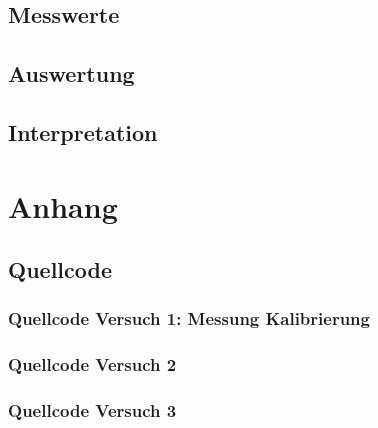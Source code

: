 \documentclass[12pt, oneside, a4paper, \docLanguage]{report}
\begin{document}
\section{Messwerte}
\label{chap:VERSUCH_3_MESSWERTE}

\section{Auswertung}
\label{chap:VERSUCH_3_AUSWERTUNG}

\section{Interpretation}
\label{chap:VERSUCH_3_INTERPRETATION}

%
%
\renewcommand\thesection{A.\arabic{section}}
\renewcommand\thesubsection{\thesection.\arabic{subsection}}

\chapter*{Anhang}
\label{chap:APPENDIX}
\addtocounter{chapter}{1}
\setcounter{section}{0}

\section{Quellcode}
\label{chap:APPENDIX_SOURCECODE}

\subsection{Quellcode Versuch 1: Messung Kalibrierung}
\label{chap:APPENDIX_SOURCECODE_V1}

\newpage
\subsection{Quellcode Versuch 2}
\label{chap:APPENDIX_SOURCECODE_V2}

\newpage
\subsection{Quellcode Versuch 3}
\label{chap:APPENDIX_SOURCECODE_V3}

\end{document}
